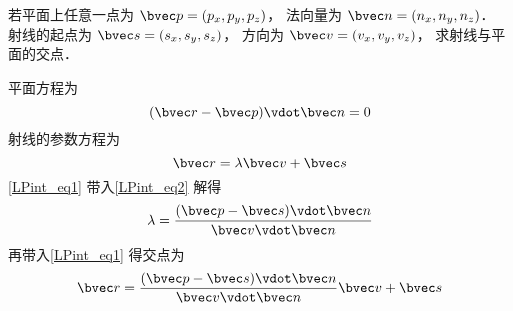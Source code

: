
若平面上任意一点为 $\bvec p = (p_x, p_y, p_z)$， 法向量为 $\bvec n = (n_x, n_y, n_z)$． 射线的起点为 $\bvec s = (s_x, s_y, s_z)$， 方向为 $\bvec v = (v_x, v_y, v_z)$， 求射线与平面的交点．

平面方程为
\begin{equation}\label{LPint_eq2}
(\bvec r - \bvec p) \vdot \bvec n = 0
\end{equation}
射线的参数方程为
\begin{equation}\label{LPint_eq1}
\bvec r = \lambda \bvec v + \bvec s
\end{equation}
\autoref{LPint_eq1} 带入\autoref{LPint_eq2} 解得
\begin{equation}
\lambda = \frac{(\bvec p - \bvec s)\vdot \bvec n}{\bvec v \vdot \bvec n}
\end{equation}
再带入\autoref{LPint_eq1} 得交点为
\begin{equation}
\bvec r = \frac{(\bvec p - \bvec s)\vdot \bvec n}{\bvec v \vdot \bvec n} \bvec v + \bvec s
\end{equation}

